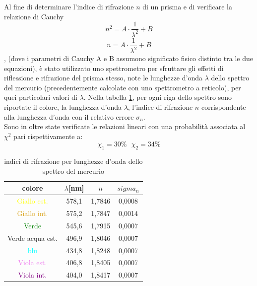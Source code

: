 \documentclass{article}
\begin{document}
        Al fine di determinare l'indice di rifrazione $n$ di un prisma e di verificare la relazione di Cauchy
        \begin{equation}
            n^2 = A \cdot \frac{1}{\lambda^2} + B 
            \label{eq:cauchy1}
        \end{equation}
        \begin{equation}
            n = A \cdot \frac{1}{\lambda^2} + B
            \label{eq:cauchy2}
        \end{equation}, 
        (dove i parametri di Cauchy A e B assumono significato fisico distinto tra le due equazioni), 
        è stato utilizzato uno spettrometro per sfruttare gli effetti di riflessione e rifrazione del prisma stesso, 
        note le lunghezze d'onda $\lambda$ dello spettro del mercurio (precedentemente calcolate con uno spettrometro a reticolo),
        per quei particolari valori di $\lambda$. Nella tabella \ref{tabular:spettro}, per ogni riga dello spettro sono riportate il colore, 
        la lunghezza d'onda $\lambda$, l'indice di rifrazione $n$ corrispondente alla lunghezza d'onda con il relativo errore $\sigma_n$.\\
        Sono in oltre state verificate le relazioni lineari con una probabilità associata al $\chi^2$ pari rispettivamente a:
        \[\chi_1 = 30\% \ \ \ \chi_2 = 34\%   \]

        \begin{table}[H]

            \centering
            \begin{tabular}{c c c c}

                \toprule 
                \textbf{colore} & \textbf{$\lambda$[nm]}  & \textbf{$n$} & \textbf{$sigma_n$}  \\

                \midrule
                \textcolor{yellow}{Giallo est.}	            &	578,1	&	1,7846 &   0,0008 \\
                \textcolor{Goldenrod}{Giallo int.}     	    &	575,2	&	1,7847 &   0,0014 \\
                \textcolor{green}{Verde}                 	&	545,6	&	1,7915 &   0,0007 \\
                \textcolor{Emerald}{Verde acqua est.}	    &	496,9	&   1,8046 &   0,0007 \\
                \textcolor{cyan}{blu}                    	&	434,8	&   1,8248 &   0,0007 \\
                \textcolor{violet}{Viola est.}             	&	406,8	&   1,8405 &   0,0007 \\
                \textcolor{purple}{Viola int.}	            &	404,0	&   1,8417 &   0,0007 \\
                \bottomrule

            \end{tabular}
            
            \caption{indici di rifrazione per lunghezze d'onda dello spettro del mercurio}
            \label{tabular:spettro}

        \end{table}
\end{document}
